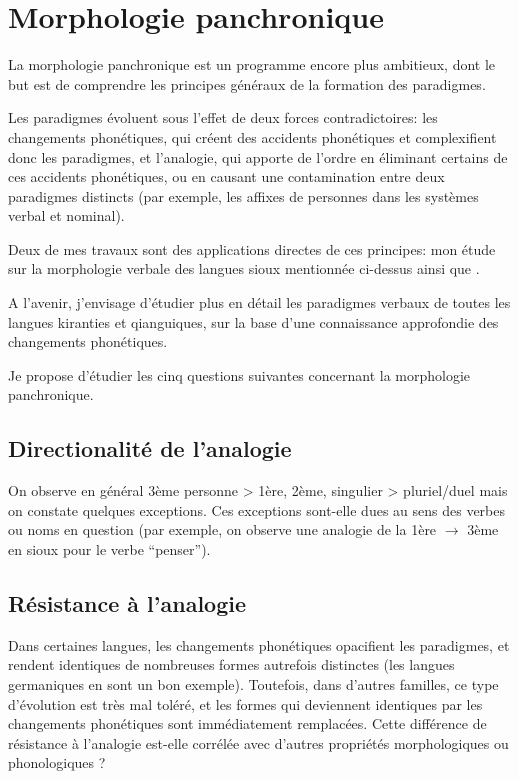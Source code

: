 \documentclass[oldfontcommands,oneside,a4paper,11pt]{memoir}
\begin{document}
\section{Morphologie panchronique} \label{sec:panchrm}
La morphologie panchronique est un programme encore plus ambitieux, dont le but est de comprendre les principes généraux de la formation des paradigmes. 
 
Les paradigmes évoluent sous l'effet de deux forces contradictoires: les changements phonétiques, qui créent des accidents phonétiques et complexifient donc les paradigmes, et l'analogie, qui apporte de l'ordre en éliminant certains de ces accidents phonétiques, ou en causant une contamination entre deux paradigmes distincts (par exemple, les affixes de personnes dans les systèmes verbal et nominal). 
 
Deux de mes travaux sont des applications directes de ces principes: mon étude sur la morphologie verbale des langues sioux mentionnée ci-dessus ainsi que \citet{jacques12agreement}.  

A l'avenir, j'envisage d'étudier plus en détail les paradigmes verbaux de toutes les langues kiranties et qianguiques, sur la base d'une connaissance approfondie des changements phonétiques. 
 
Je propose d'étudier les cinq questions suivantes concernant la morphologie panchronique.

\subsection{Directionalité de l'analogie}
On observe en général 3ème personne > 1ère, 2ème, singulier > pluriel/duel mais on constate quelques exceptions. Ces exceptions sont-elle dues au sens des verbes ou noms en question (par exemple, on observe une analogie de la 1ère $\rightarrow $ 3ème en sioux pour le verbe ``penser''). 
\subsection{Résistance à l'analogie}
  Dans certaines langues, les changements phonétiques opacifient les paradigmes, et rendent identiques de nombreuses formes autrefois distinctes (les langues germaniques en sont un bon exemple). Toutefois, dans d'autres familles, ce type d'évolution est très mal toléré, et les formes qui deviennent identiques par les changements phonétiques sont immédiatement remplacées.  Cette différence de résistance à l'analogie est-elle corrélée avec d'autres propriétés morphologiques ou phonologiques ?
\end{document}
